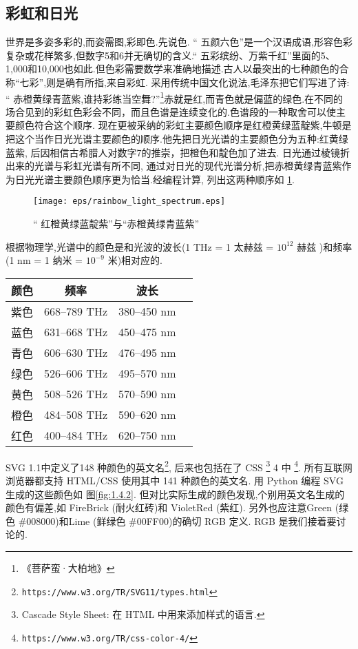 \subsection{彩虹和日光}
世界是多姿多彩的,而姿需图,彩即色.先说色.
“ 五颜六色”是一个汉语成语,形容色彩复杂或花样繁多,但数字5和6并无确切的含义.“ 
五彩缤纷、万紫千红”里面的5、1,000和10,000也如此.但色彩需要数学来准确地描述.古人以最突出的七种颜色的合称“七彩”,则是确有所指,来自彩虹.
采用传统中国文化说法,毛泽东把它们写进了诗: “ 赤橙黄绿青蓝紫,谁持彩练当空舞?”\footnote{《菩萨蛮·大柏地》}赤就是红,而青色就是偏蓝的绿色.在不同的场合见到的彩虹色彩会不同，而且色谱是连续变化的.色谱段的一种取舍可以使主要颜色符合这个顺序.
现在更被采纳的彩虹主要颜色顺序是红橙黄绿蓝靛紫,牛顿是把这个当作日光光谱主要颜色的顺序.他先把日光光谱的主要颜色分为五种:红黄绿蓝紫,
后因相信古希腊人对数字7的推崇，把橙色和靛色加了进去.
日光通过棱镜折出来的光谱与彩虹光谱有所不同,
通过对日光的现代光谱分析,把赤橙黄绿青蓝紫作为日光光谱主要颜色顺序更为恰当.经编程计算, 列出这两种顺序如 \ref{fig:1.4.1}.

\begin{figure}[h]
	\centering
	\texttt{[image: eps/rainbow\_light\_spectrum.eps]}
	\caption{“ 红橙黄绿蓝靛紫”与“赤橙黄绿青蓝紫” }
	\label{fig:1.4.1}
\end{figure}
根据物理学,光谱中的颜色是和光波的波长(1 THz = 1 太赫兹 = $10^{12}$ 赫兹 )和频率(1 nm = 1 纳米 = $10^{-9}$ 米)相对应的.
\begin{center}
	\begin{tabular}{c c c c} 
		\hline
		颜色 & 频率 & 波长  \\ [0.5ex] 
		\hline
		紫色 & 668–789 THz & 380–450 nm \\
		蓝色 & 631–668 THz & 450–475 nm \\
		青色 & 606–630 THz & 476–495 nm \\
		绿色 & 526–606 THz & 495–570 nm \\
		黄色 & 508–526 THz & 570–590 nm \\
		橙色 & 484–508 THz & 590–620 nm \\
		红色 & 400–484 THz & 620–750 nm \\		
		\hline
	\end{tabular}
\end{center}

SVG 1.1中定义了148 种颜色的英文名\footnote{ \texttt{https://www.w3.org/TR/SVG11/types.html}}, 
后来也包括在了 CSS \footnote{Cascade Style Sheet: 在 HTML 中用来添加样式的语言.} 4 中 \footnote{ \texttt{https://www.w3.org/TR/css-color-4/}}.
所有互联网浏览器都支持 HTML/CSS 使用其中 141 种颜色的英文名.
用 Python 编程 SVG 生成的这些颜色如 图\ref{fig:1.4.2}.
但对比实际生成的颜色发现,个别用英文名生成的颜色有偏差,如 FireBrick (耐火红砖)和
VioletRed (紫红). 另外也应注意Green (绿色 \#{}008000)和Lime (鲜绿色 \#{}00FF00)的确切 RGB 定义. RGB 是我们接着要讨论的.

